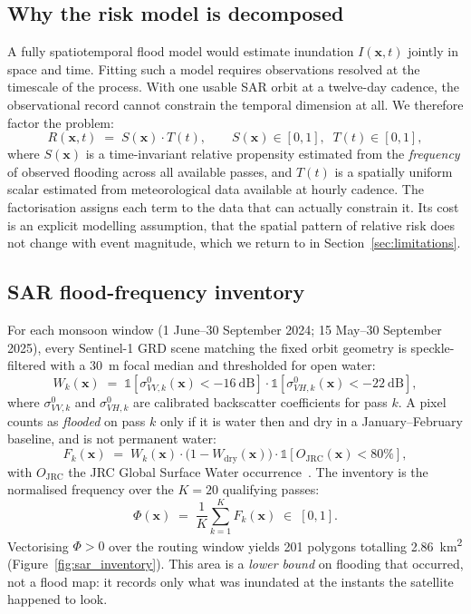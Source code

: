 \documentclass[11pt,a4paper]{article}
\newcommand{\Sx}{S(\mathbf{x})}
\newcommand{\Tt}{T(t)}
\newcommand{\Rxt}{R(\mathbf{x},t)}
\begin{document}
\subsection{Why the risk model is decomposed}
\label{sec:method-decomp}
A fully spatiotemporal flood model would estimate inundation
$I(\mathbf{x},t)$ jointly in space and time. Fitting such a model requires
observations resolved at the timescale of the process. With one usable SAR orbit
at a twelve-day cadence, the observational record cannot constrain the temporal
dimension at all. We therefore factor the problem:
\begin{equation}
\Rxt \;=\; \Sx \cdot \Tt,
\qquad \Sx\in[0,1],\;\; \Tt\in[0,1],
\label{eq:fusion}
\end{equation}
where $\Sx$ is a time-invariant relative propensity estimated from the
\emph{frequency} of observed flooding across all available passes, and $\Tt$ is a
spatially uniform scalar estimated from meteorological data available at hourly
cadence. The factorisation assigns each term to the data that can actually
constrain it. Its cost is an explicit modelling assumption, that the spatial
pattern of relative risk does not change with event magnitude, which we return to
in Section~\ref{sec:limitations}.

\subsection{SAR flood-frequency inventory}
For each monsoon window (1 June--30 September 2024; 15 May--30 September 2025),
every Sentinel-1 GRD scene matching the fixed orbit geometry is speckle-filtered
with a \SI{30}{\metre} focal median and thresholded for open water:
\begin{equation}
W_k(\mathbf{x}) \;=\;
\mathbb{1}\!\left[\sigma^0_{VV,k}(\mathbf{x}) < \SI{-16}{\deci\bel}\right]\cdot
\mathbb{1}\!\left[\sigma^0_{VH,k}(\mathbf{x}) < \SI{-22}{\deci\bel}\right],
\label{eq:water}
\end{equation}
where $\sigma^0_{VV,k}$ and $\sigma^0_{VH,k}$ are calibrated backscatter
coefficients for pass $k$. A pixel counts as \emph{flooded} on pass $k$ only if it
is water then and dry in a January--February baseline, and is not permanent water:
\begin{equation}
F_k(\mathbf{x}) \;=\; W_k(\mathbf{x})\cdot\bigl(1-W_{\text{dry}}(\mathbf{x})\bigr)
\cdot\mathbb{1}\!\left[O_{\text{JRC}}(\mathbf{x}) < 80\%\right],
\label{eq:floodpass}
\end{equation}
with $O_{\text{JRC}}$ the JRC Global Surface Water occurrence~\citep{pekel2016}.
The inventory is the normalised frequency over the $K=20$ qualifying passes:
\begin{equation}
\Phi(\mathbf{x}) \;=\; \frac{1}{K}\sum_{k=1}^{K} F_k(\mathbf{x}) \;\in\; [0,1].
\label{eq:freq}
\end{equation}
Vectorising $\Phi>0$ over the routing window yields 201 polygons totalling
\SI{2.86}{\kilo\metre\squared} (Figure~\ref{fig:sar_inventory}). This area is a
\emph{lower bound} on flooding that occurred, not a flood map: it records only
what was inundated at the instants the satellite happened to look.
\end{document}
